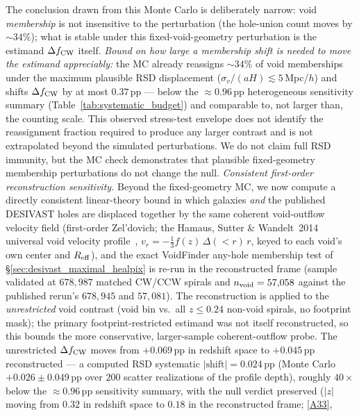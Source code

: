 \documentclass[twocolumn,linenumbers]{aastex702}
\newcommand{\repoBase}{https://github.com/Hubify-Projects/bigbounce/blob/main}
\begin{document}
\iffalse
The conclusion drawn from this Monte Carlo is deliberately narrow:
void \emph{membership} is not insensitive to the perturbation (the
hole-union count moves by ${\sim}34\%$); what is stable under this
fixed-void-geometry perturbation is the estimand $\Delta f_{\rm CW}$
itself. \emph{Bound on how large a membership shift is needed to move the
estimand appreciably:} the MC already reassigns ${\sim}34\%$ of
void memberships under the maximum plausible RSD displacement
($\sigma_v/(aH)\!\lesssim\!5$\,Mpc/$h$) and shifts $\Delta f_{\rm CW}$
by at most $0.37$\,pp --- below the
${\approx}0.96$\,pp heterogeneous sensitivity summary
(Table~\ref{tab:systematic_budget}) and comparable to, not larger than,
the counting scale. This observed stress-test envelope does not identify
the reassignment fraction required to produce any larger contrast and is
not extrapolated beyond the simulated perturbations. We do not claim full RSD immunity,
but the MC check demonstrates that plausible fixed-geometry membership
perturbations do not change the null. \emph{Consistent first-order
reconstruction sensitivity.} Beyond the
fixed-geometry MC, we now compute a directly consistent linear-theory
bound in which galaxies \emph{and} the published DESIVAST holes are
displaced together by the same coherent void-outflow velocity field
(first-order Zel'dovich; the Hamaus, Sutter \& Wandelt~2014
universal void velocity profile~\cite{Hamaus2014},
$v_r = -\tfrac{1}{3}f(z)\,\Delta(<r)\,r$, keyed to each void's own
center and $R_{\rm eff}$), and the exact VoidFinder any-hole
membership test of \S\ref{sec:desivast_maximal_healpix} is re-run in the
reconstructed frame (sample validated at $678{,}987$ matched CW/CCW
spirals and $n_{\rm void}=57{,}058$ against the published rerun's
$678{,}945$ and $57{,}081$). The reconstruction is applied to the
\emph{unrestricted} void contrast (void bin vs.\ all $z\le0.24$ non-void
spirals, no footprint mask); the primary footprint-restricted estimand
was not itself reconstructed, so this bounds the more conservative,
larger-sample coherent-outflow probe. The unrestricted
$\Delta f_{\rm CW}$ moves from $+0.069$\,pp in redshift space to
$+0.045$\,pp reconstructed --- a computed RSD systematic
$|\text{shift}| = 0.024$\,pp (Monte Carlo $+0.026 \pm 0.049$\,pp over
$200$ scatter realizations of the profile depth), roughly $40\times$
below the ${\approx}0.96$\,pp sensitivity summary, with the null verdict
preserved ($|z|$ moving from $0.32$ in redshift space to $0.18$ in the
reconstructed frame;
\href{\repoBase/pipelines/p5\_desi\_chirality/outputs/27\_rsd\_void\_recon\_bound.json}{[A33]},
\end{document}
